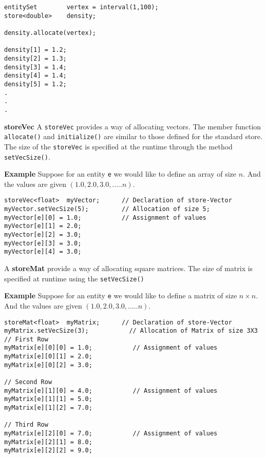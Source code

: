 \begin{verbatim}
entitySet        vertex = interval(1,100);
store<double>    density;

density.allocate(vertex);

density[1] = 1.2;
density[2] = 1.3;
density[3] = 1.4;
density[4] = 1.4;
density[5] = 1.2;
.
.
.
\end{verbatim}
\par {\bf storeVec } A {\tt storeVec} provides a way of allocating vectors. The member 
function {\tt allocate()} and {\tt initialize()} are similar to those 
defined for the standard store. The size of the {\tt storeVec} is
specified at the runtime through the method {\tt setVecSize()}.
\par {\bf Example} Suppose for an entity {\tt e} we would like to define an array
of size ${n}$. And the values are given $(1.0,2.0,3.0,.....n)$. 
\begin{verbatim}
storeVec<float>  myVector;      // Declaration of store-Vector
myVector.setVecSize(5);         // Allocation of size 5;
myVector[e][0] = 1.0;           // Assignment of values 
myVector[e][1] = 2.0;
myVector[e][2] = 3.0;
myVector[e][3] = 3.0;
myVector[e][4] = 3.0;
\end{verbatim}
%
\par A {\bf storeMat} provide a way of allocating square matrices. The 
size of matrix is specified at runtime using the {\tt setVecSize()}
\par {\bf Example} Suppose for an entity {\tt e} we would like to define a matrix
of size ${n \times n}$. And the values are given $(1.0,2.0,3.0,.....n)$. 
%
\begin{verbatim}
storeMat<float>  myMatrix;      // Declaration of store-Vector
myMatrix.setVecSize(3);           // Allocation of Matrix of size 3X3
// First Row
myMatrix[e][0][0] = 1.0;           // Assignment of values 
myMatrix[e][0][1] = 2.0;
myMatrix[e][0][2] = 3.0;

// Second Row
myMatrix[e][1][0] = 4.0;           // Assignment of values 
myMatrix[e][1][1] = 5.0;
myMatrix[e][1][2] = 7.0;

// Third Row
myMatrix[e][2][0] = 7.0;           // Assignment of values 
myMatrix[e][2][1] = 8.0;
myMatrix[e][2][2] = 9.0;
\end{verbatim}
%
%
